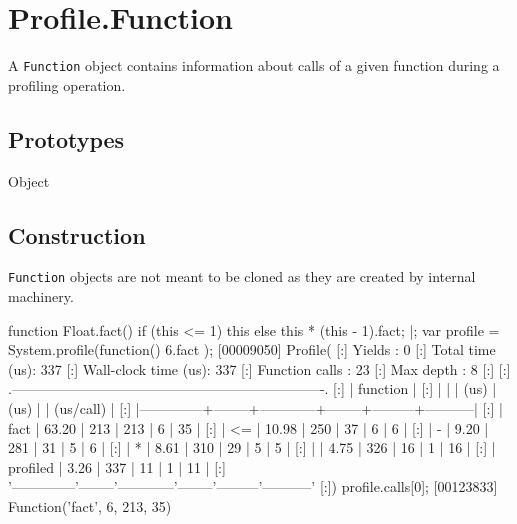 
\section{Profile.Function}

A \lstinline|Function| object contains information about calls of a
given function during a profiling operation.

\subsection{Prototypes}

\begin{refObjects}
\item[Object]
\end{refObjects}

\subsection{Construction}

\lstinline|Function| objects are not meant to be cloned as they are
created by  internal machinery.

\begin{urbiscript}
function Float.fact()
{
  if (this <= 1)
    this
  else
    this * (this - 1).fact;
}|;
var profile = System.profile(function() { 6.fact });
[00009050] Profile(
[:]  Yields              :      0
[:]  Total time      (us):    337
[:]  Wall-clock time (us):    337
[:]  Function calls      :     23
[:]  Max depth           :      8
[:]
[:]  .-------------------------------------------------------------------.
[:]  |   function   |   %
[:]  |              |        |    (us)    |  (us)  |         | (us/call) |
[:]  |--------------+--------+------------+--------+---------+-----------|
[:]  |         fact |  63.20 |        213 |    213 |       6 |        35 |
[:]  |           <= |  10.98 |        250 |     37 |       6 |         6 |
[:]  |            - |   9.20 |        281 |     31 |       5 |         6 |
[:]  |            * |   8.61 |        310 |     29 |       5 |         5 |
[:]  |              |   4.75 |        326 |     16 |       1 |        16 |
[:]  |     profiled |   3.26 |        337 |     11 |       1 |        11 |
[:]  '--------------'--------'------------'--------'---------'-----------'
[:])
profile.calls[0];
[00123833] Function('fact', 6, 213, 35)
\end{urbiscript}

